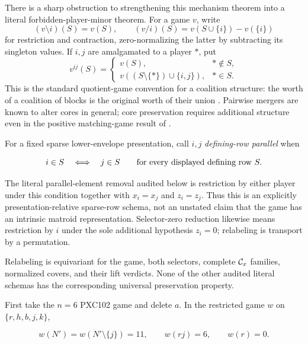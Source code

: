 \documentclass[11pt]{article}
\begin{document}
There is a sharp obstruction to strengthening this mechanism theorem into a
literal forbidden-player-minor theorem.  For a game \(v\), write
\[
 (v\setminus i)(S)=v(S),\qquad
 (v/i)(S)=v(S\cup\{i\})-v(\{i\})
\]
for restriction and contraction, zero-normalizing the latter by subtracting
its singleton values.  If \(i,j\) are amalgamated to a player \(*\), put
\begin{equation}
 v^{ij}(S)=
 \begin{cases}
 v(S),& *\notin S,\\
 v((S\setminus\{*\})\cup\{i,j\}),& *\in S.
 \end{cases}                                                \tag{PXC115a}
\end{equation}
This is the standard quotient-game convention for a coalition structure:
the worth of a coalition of blocks is the original worth of their union
\citep{ZouEtAl2023}.  Pairwise mergers are known to alter cores in general;
core preservation requires additional structure even in the positive
matching-game result of \citet{Hezarkhani2016}.

For a fixed sparse lower-envelope presentation, call \(i,j\)
\emph{defining-row parallel} when

\[
 i\in S\quad\Longleftrightarrow\quad j\in S
 \qquad\hbox{for every displayed defining row }S.
\]

The literal parallel-element removal audited below is restriction by either
player under this condition together with \(x_i=x_j\) and \(z_i=z_j\).
Thus this is an explicitly presentation-relative sparse-row schema, not an
unstated claim that the game has an intrinsic matroid representation.
Selector-zero reduction likewise means restriction by \(i\) under the sole
additional hypothesis \(z_i=0\); relabeling is transport by a permutation.

Relabeling is equivariant for the game, both selectors, complete
\({\cal C}_x\) families, normalized covers, and their lift verdicts.  None of
the other audited literal schemas has the corresponding universal
preservation property.

First take the \(n=6\) PXC102 game and delete \(a\).  In the restricted game
\(w\) on \(\{r,h,b,j,k\}\),


\begin{equation}
 w(N')=w(N'\setminus\{j\})=11,\qquad w(rj)=6,\qquad w(r)=0.
                                                               \tag{PXC115b}
\end{equation}
\end{document}
